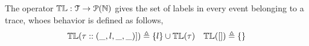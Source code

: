   The operator $\mathbb{TL} : \mathcal{T} \to \mathcal{P}{(\mathbb{N})}$ gives the set of labels in every event belonging to 
  a trace, whoes behavior is defined as follows,
\[
\mathbb{TL}{(\mathtt{\tau}  :: (\_, l, \_, \_)])} \triangleq \{l\} \cup \mathbb{TL}{(\mathtt{\tau} )}
~~~
\mathbb{TL}({[ ]}) \triangleq \{\}
\]
%
%
%
%
%

